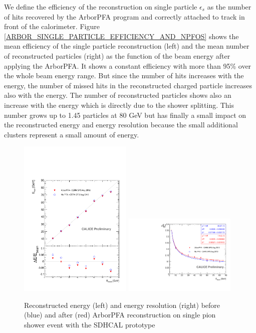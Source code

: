\documentclass[cits]{JINST}
\begin{document}
We define the efficiency of the reconstruction on single particle $\epsilon_s$ as the number of hits recovered by the ArborPFA program and correctly attached to track in front of the calorimeter. Figure \ref{ARBOR_SINGLE_PARTICLE_EFFICIENCY_AND_NPFOS} shows the mean efficiency of the single particle reconstruction (left) and the mean number of reconstructed particles (right) as the function of the beam energy after applying the ArborPFA. It shows a constant efficiency with more than 95\% over the whole beam energy range. But since the number of hits increases with the energy, the number of missed hits in the reconstructed charged particle increases also with the energy. The number of reconstructed particles shows also an increase with the energy which is directly due to the shower splitting. This number grows up to 1.45 particles at 80 GeV but has finally a small impact on the reconstructed energy and energy resolution because the small additional clusters represent a small amount of energy. 

\begin{figure}[!h]
  \begin{center}
    \includegraphics[width=0.48\textwidth]{plots/SingleParticle_ERec.pdf}
    \includegraphics[width=0.48\textwidth]{plots/SingleParticle_EResol.pdf} \\
  \end{center}
  \caption{\label{ARBOR_SINGLE_PARTICLE_EREC_AND_ERESOL} Reconstructed energy (left) and energy resolution (right) before (blue) and after (red) ArborPFA reconstruction on single pion shower event with the SDHCAL prototype}
\end{figure}
\end{document}
